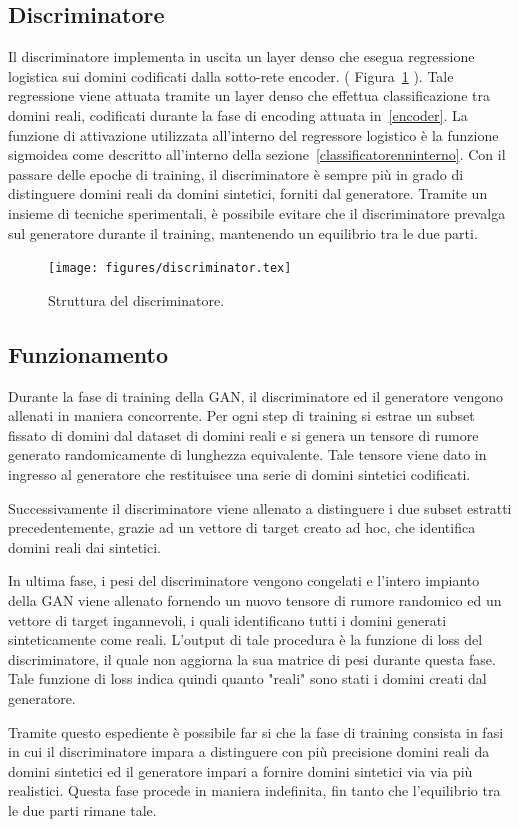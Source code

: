 \subsection{Discriminatore}
\label{discriminator}
Il discriminatore implementa in uscita un layer denso che esegua regressione logistica sui domini codificati dalla sotto-rete encoder. ( Figura~\ref{fig:discriminator} ). Tale regressione viene attuata tramite un layer denso che effettua classificazione tra domini reali, codificati durante la fase di encoding attuata in~\ref{encoder}. La funzione di attivazione utilizzata all'interno del regressore logistico è la funzione sigmoidea come descritto all'interno della sezione~\ref{classificatorenninterno}. Con il passare delle epoche di training, il discriminatore è sempre più in grado di distinguere domini reali da domini sintetici, forniti dal generatore. Tramite un insieme di tecniche sperimentali, è possibile evitare che il discriminatore prevalga sul generatore durante il training, mantenendo un equilibrio tra le due parti. 

\begin{figure}[htbp]
    \centering
	\texttt{[image: figures/discriminator.tex]}
	\caption{Struttura del discriminatore.
\label{fig:discriminator}}
\end{figure}

\subsection{Funzionamento}
Durante la fase di training della GAN, il discriminatore ed il generatore vengono allenati in maniera concorrente. Per ogni step di training si estrae un subset fissato di domini dal dataset di domini reali e si genera un tensore di rumore generato randomicamente di lunghezza equivalente. Tale tensore viene dato in ingresso al generatore che restituisce una serie di domini sintetici codificati.

Successivamente il discriminatore viene allenato a distinguere i due subset estratti precedentemente, grazie ad un vettore di target creato ad hoc, che identifica domini reali dai sintetici.

In ultima fase, i pesi del discriminatore vengono congelati e l'intero impianto della GAN viene allenato fornendo un nuovo tensore di rumore randomico ed un vettore di target ingannevoli, i quali identificano tutti i domini generati sinteticamente come reali. L'output di tale procedura è la funzione di loss del discriminatore, il quale non aggiorna la sua matrice di pesi durante questa fase. Tale funzione di loss indica quindi quanto "reali" sono stati i domini creati dal generatore.

Tramite questo espediente è possibile far si che la fase di training consista in fasi in cui il discriminatore impara a distinguere con più precisione domini reali da domini sintetici ed il generatore impari a fornire domini sintetici via via più realistici. Questa fase procede in maniera indefinita, fin tanto che l'equilibrio tra le due parti rimane tale.

